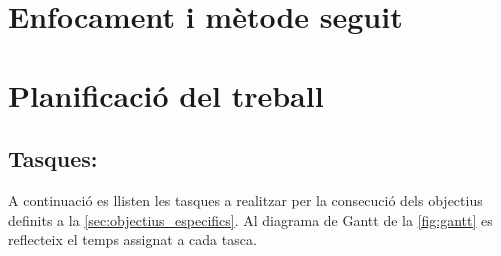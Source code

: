 \documentclass[CAT,BIB]{TFUOC}%
\begin{document}
    \section{Enfocament i mètode seguit}


    \section{Planificació del treball}

        \subsection{Tasques:}
        \label{sec:tasques}

            A continuació es llisten les tasques a realitzar per la consecució dels objectius definits a la \cref{sec:objectius_especifics}. Al diagrama de Gantt de la \cref{fig:gantt} es reflecteix el temps assignat a cada tasca.
\end{document}
